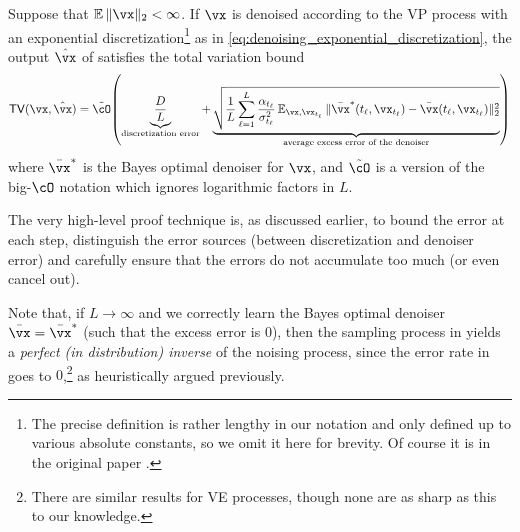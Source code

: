 \documentclass[../../book-main.tex]{subfiles}
\begin{document}
\begin{theorem}\label{thm:diffusion_sampler_convergence}
	Suppose that \(\Ex\norm{\vx}_{2} < \infty\).  If \(\vx\) is denoised according to the VP process with an exponential discretization\footnote{The precise definition is rather lengthy in our notation and only defined up to various absolute constants, so we omit it here for brevity. Of course it is in the original paper \citep{li2024d}.} as in \eqref{eq:denoising_exponential_discretization}, the output \(\hat{\vx}\) of  satisfies the total variation bound
	\begin{equation}\label{eq:diffusion_sampling_error}
		\TV(\vx, \hat{\vx}) = \tilde{\cO}\rp{\underbrace{\frac{D}{L}}_{\text{discretization error}} + \underbrace{\sqrt{\frac{1}{L}\sum_{\ell = 1}^{L}\frac{\alpha_{t_{\ell}}}{\sigma_{t_{\ell}}^{2}}\Ex_{\vx, \vx_{t_{\ell}}}\norm{\bar{\vx}^{\ast}(t_{\ell}, \vx_{t_{\ell}}) - \bar{\vx}(t_{\ell}, \vx_{t_{\ell}})}_{2}^{2}}}_{\text{average excess error of the denoiser}}}
	\end{equation}
	where \(\bar{\vx}^{\ast}\) is the Bayes optimal denoiser for \(\vx\), and \(\tilde{\cO}\) is a version of the big-\(\cO\) notation which ignores logarithmic factors in \(L\).
\end{theorem}
The very high-level proof technique is, as discussed earlier, to bound the error at each step, distinguish the error sources (between discretization and denoiser error) and carefully ensure that the errors do not accumulate too much (or even cancel out). 

Note that, if \(L \to \infty\) and we correctly learn the Bayes optimal denoiser \(\bar{\vx} = \bar{\vx}^{\ast}\) (such that the excess error is \(0\)), then the sampling process in  yields a \textit{perfect (in distribution) inverse} of the noising process, since the error rate in  goes to \(0\),\footnote{There are similar results for VE processes, though none are as sharp as this to our knowledge.} as heuristically argued previously.
\end{document}
